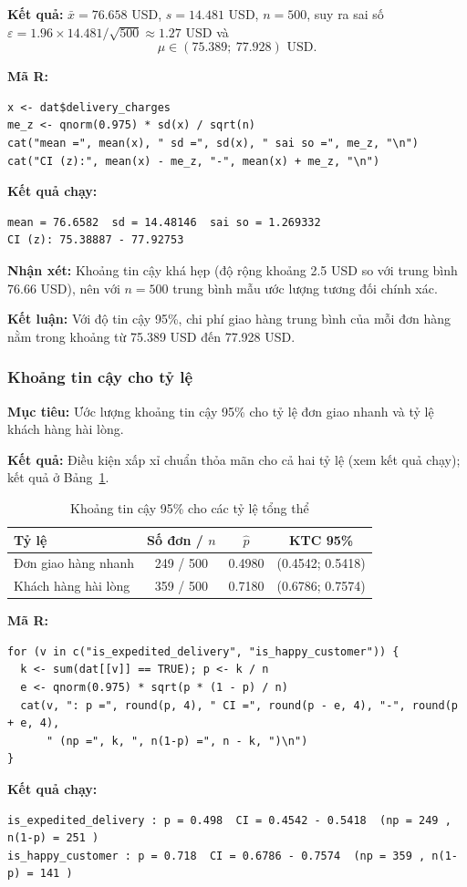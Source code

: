\textbf{Kết quả:} $\bar{x} = 76.658$ USD, $s = 14.481$ USD, $n = 500$, suy ra sai số $\varepsilon = 1.96 \times 14.481/\sqrt{500} \approx 1.27$ USD và
$$ \mu \in (75.389;\ 77.928) \text{ USD}. $$

\textbf{Mã R:}
\begin{lstlisting}
x <- dat$delivery_charges
me_z <- qnorm(0.975) * sd(x) / sqrt(n)       
cat("mean =", mean(x), " sd =", sd(x), " sai so =", me_z, "\n")
cat("CI (z):", mean(x) - me_z, "-", mean(x) + me_z, "\n")
\end{lstlisting}
\textbf{Kết quả chạy:}
\begin{lstlisting}[style=rout]
mean = 76.6582  sd = 14.48146  sai so = 1.269332 
CI (z): 75.38887 - 77.92753 
\end{lstlisting}

\textbf{Nhận xét:} Khoảng tin cậy khá hẹp (độ rộng khoảng 2.5 USD so với trung bình 76.66 USD), nên với $n = 500$ trung bình mẫu ước lượng tương đối chính xác.

\textbf{Kết luận:} Với độ tin cậy 95\%, chi phí giao hàng trung bình của mỗi đơn hàng nằm trong khoảng từ 75.389 USD đến 77.928 USD.

\subsubsection{Khoảng tin cậy cho tỷ lệ}
\textbf{Mục tiêu:} Ước lượng khoảng tin cậy 95\% cho tỷ lệ đơn giao nhanh và tỷ lệ khách hàng hài lòng.

\textbf{Kết quả:} Điều kiện xấp xỉ chuẩn thỏa mãn cho cả hai tỷ lệ (xem kết quả chạy); kết quả ở Bảng~\ref{tab:ci_tyle}.
\begin{table}[H]
    \centering
    \begin{tabular}{|l|c|c|c|}
    \hline
    \textbf{Tỷ lệ} & \textbf{Số đơn / $n$} & $\hat{p}$ & \textbf{KTC 95\%} \\ \hline
    Đơn giao hàng nhanh & 249 / 500 & 0.4980 & (0.4542; 0.5418) \\ \hline
    Khách hàng hài lòng & 359 / 500 & 0.7180 & (0.6786; 0.7574) \\ \hline
    \end{tabular}
    \caption{Khoảng tin cậy 95\% cho các tỷ lệ tổng thể}
    \label{tab:ci_tyle}
\end{table}

\textbf{Mã R:}
\begin{lstlisting}
for (v in c("is_expedited_delivery", "is_happy_customer")) {
  k <- sum(dat[[v]] == TRUE); p <- k / n
  e <- qnorm(0.975) * sqrt(p * (1 - p) / n)      
  cat(v, ": p =", round(p, 4), " CI =", round(p - e, 4), "-", round(p + e, 4),
      " (np =", k, ", n(1-p) =", n - k, ")\n")
}
\end{lstlisting}
\textbf{Kết quả chạy:}
\begin{lstlisting}[style=rout]
is_expedited_delivery : p = 0.498  CI = 0.4542 - 0.5418  (np = 249 , n(1-p) = 251 )
is_happy_customer : p = 0.718  CI = 0.6786 - 0.7574  (np = 359 , n(1-p) = 141 )
\end{lstlisting}


